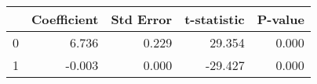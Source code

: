 \begin{tabular}{lrrrr}
\toprule
 & Coefficient & Std Error & t-statistic & P-value \\
\midrule
0 & 6.736 & 0.229 & 29.354 & 0.000 \\
1 & -0.003 & 0.000 & -29.427 & 0.000 \\
\bottomrule
\end{tabular}
